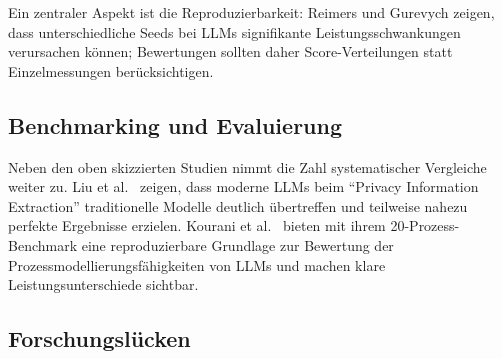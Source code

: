Ein zentraler Aspekt ist die Reproduzierbarkeit: Reimers und Gurevych \cite{reimers2017reporting} zeigen, dass unterschiedliche Seeds bei \acp{LLM} signifikante Leistungsschwankungen verursachen können; Bewertungen sollten daher Score-Verteilungen statt Einzelmessungen berücksichtigen.

\subsection*{Benchmarking und Evaluierung}

Neben den oben skizzierten Studien nimmt die Zahl systematischer Vergleiche weiter zu. Liu et al.\ \cite{liu2024privacy} zeigen, dass moderne \acp{LLM} beim \enquote{Privacy Information Extraction} traditionelle Modelle deutlich übertreffen und teilweise nahezu perfekte Ergebnisse erzielen. Kourani et al.\ \cite{kourani2025evaluating} bieten mit ihrem 20-Prozess-Benchmark eine reproduzierbare Grundlage zur Bewertung der Prozessmodellierungsfähigkeiten von \acp{LLM} und machen klare Leistungsunterschiede sichtbar.

\subsection*{Forschungslücken}


